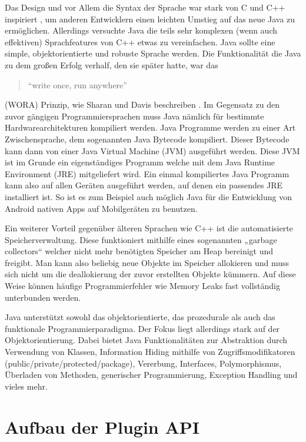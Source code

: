 Das Design und vor Allem die Syntax der Sprache war stark von C und C++ inspiriert \cite{ArnoldKen1996TJpl}, 
um anderen Entwicklern einen leichten Umstieg auf das neue Java zu ermöglichen. 
Allerdings versuchte Java die teils sehr komplexen (wenn auch effektiven) 
Sprachfeatures von C++ etwas zu vereinfachen. Java sollte eine simple, objektorientierte 
und robuste Sprache werden. Die Funktionalität die Java zu dem großen Erfolg verhalf, 
den sie später hatte, war das 
\begin{quote}\begin{english}\enquote{write once, run anywhere}\end{english}\end{quote}
(WORA) Prinzip, wie Sharan und Davis beschreiben \cite{SharanKishori2022BJ1f}. Im Gegensatz 
zu den zuvor gängigen Programmiersprachen muss Java nämlich für bestimmte 
Hardwarearchitekturen kompiliert werden. Java Programme werden zu einer Art 
Zwischensprache, dem sogenannten Java Bytecode kompiliert. Dieser Bytecode
kann dann von einer Java Virtual Machine (JVM) ausgeführt werden. Diese JVM ist
im Grunde ein eigenständiges Programm welche mit dem Java Runtime Environment 
(JRE) mitgeliefert wird. Ein einmal kompiliertes Java Programm kann also auf 
allen Geräten ausgeführt werden, auf denen ein passendes JRE installiert ist. 
So ist es zum Beispiel auch möglich Java für die Entwicklung von Android nativen
Apps auf Mobilgeräten zu benutzen.

Ein weiterer Vorteil gegenüber älteren Sprachen wie C++ ist die
automatisierte Speicherverwaltung. Diese funktioniert mithilfe eines 
sogenannten „garbage collectors“ welcher nicht mehr benötigten Speicher
am Heap bereinigt und freigibt. Man kann also beliebig neue Objekte im Speicher
allokieren und muss sich nicht um die deallokierung der zuvor erstellten Objekte
kümmern. Auf diese Weise können häufige Programmierfehler wie Memory Leaks fast 
vollständig unterbunden werden.

Java unterstützt sowohl das objektorientierte, das prozedurale als auch das funktionale 
Programmierparadigma. Der Fokus liegt allerdings stark auf der Objektorientierung. 
Dabei bietet Java Funktionalitäten zur Abstraktion durch Verwendung von Klassen, Information Hiding
mithilfe von Zugriffsmodifikatoren (public/private/protected/package), Vererbung, 
Interfaces, Polymorphismus, Überladen von Methoden, generischer Programmierung, 
Exception Handling und vieles mehr.

\section{Aufbau der Plugin API}
\label{sec:AufbauDerPluginAPI}

